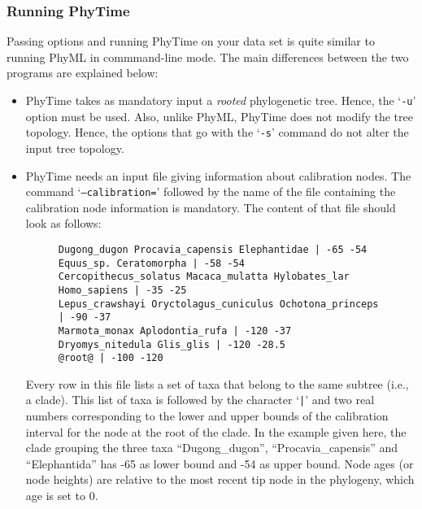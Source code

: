 \documentclass[a4paper,12pt]{article}
\newcommand{\x}[1]{\texttt{#1}}
\begin{document}
\subsubsection{Running  PhyTime} Passing  options and  running  PhyTime on  your data  set is  quite
similar to running  PhyML in commmand-line mode.  The main differences between the  two programs are
explained below:
\begin{itemize}
\item PhyTime takes as mandatory input a {\em rooted} phylogenetic tree.  Hence, the `\x{-u}' option
must be used. Also, unlike PhyML, PhyTime does not modify the tree topology. Hence, the options that
go with the `\x{-s}' command do not alter the input tree topology.
\item  PhyTime  needs  an input  file  giving  information  about  calibration nodes.   The  command
`\x{--calibration=}' followed by the name of  the file containing the calibration node information is
mandatory. The content of that file should look as follows:

\begin{figure}[h]
\begin{small}
\begin{Verbatim}[frame=single, label=Calibration node file, samepage=true, baselinestretch=0.5]
Dugong_dugon Procavia_capensis Elephantidae | -65 -54
Equus_sp. Ceratomorpha | -58 -54
Cercopithecus_solatus Macaca_mulatta Hylobates_lar Homo_sapiens | -35 -25
Lepus_crawshayi Oryctolagus_cuniculus Ochotona_princeps | -90 -37
Marmota_monax Aplodontia_rufa | -120 -37 
Dryomys_nitedula Glis_glis | -120 -28.5
@root@ | -100 -120
\end{Verbatim}
\end{small}
\end{figure}

Every row in  this file lists a  set of taxa that belong  to the same subtree (i.e.,  a clade). This
list of taxa  is followed by the character  `\x{|}' and two real numbers corresponding  to the lower
and upper bounds of the  calibration interval for the node at the root of  the clade. In the example
given  here,  the  clade  grouping  the three  taxa  ``Dugong\_dugon'',  ``Procavia\_capensis''  and
``Elephantida'' has  -65 as lower  bound and -54  as upper bound.  Node  ages (or node  heights) are
relative to the most recent tip node in the phylogeny, which age is set to 0. 


\end{itemize}
\end{document}
